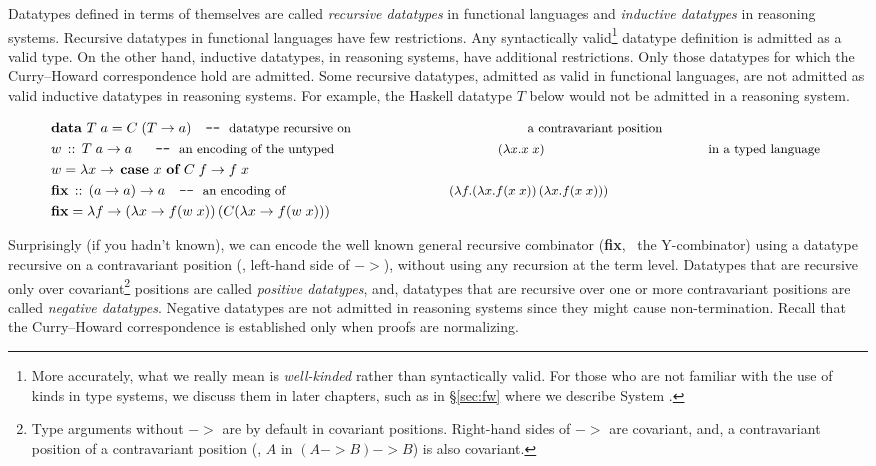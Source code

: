 Datatypes defined in terms of themselves are called \emph{recursive datatypes}
in functional languages and \emph{inductive datatypes} in reasoning systems.
Recursive datatypes in functional languages have few restrictions.
Any syntactically valid\footnote{
        More accurately, what we really mean is \emph{well-kinded} rather than
        syntactically valid. 
        For those who are not familiar with the use of kinds in type systems, 
        we discuss them in later chapters, such as
        in \S\ref{sec:fw} where we describe System \Fw.}
datatype definition is admitted as a valid type. On the other hand,
inductive datatypes, in reasoning systems, have additional restrictions.
Only those datatypes for which the Curry--Howard correspondence hold are
admitted. Some recursive datatypes, admitted as valid in functional languages,
are not admitted as valid inductive datatypes in reasoning systems. For example,
the Haskell datatype $T$ below would not be admitted in a reasoning system.
\vspace*{-2.5em}
\begin{singlespace}
\begin{align*}
& \textbf{data}~T\;a = C\;(T -> a) \quad
          \texttt{-}\texttt{-}~\text{\small datatype recursive on
                                        a contravariant position} \\
& w \,::\, T\;a -> a ~~ \quad
          \texttt{-}\texttt{-}~\text{\small an encoding of the untyped
                                     $(\lambda x.x\;x)$
                                     in a typed language}~ \\
& w = \lambda x -> \,\textbf{case}~x~\textbf{of}~C\;f -> f\;x \\
& \textbf{fix} \,::\, (a -> a) -> a \quad
          \texttt{-}\texttt{-}~\text{\small an encoding of 
                                     $(\lambda f.(\lambda x.f(x\;x))\,
                                                 (\lambda x.f(x\;x)))$} \\
& \textbf{fix} = \lambda f -> (\lambda x -> f (w\;x))\,(C(\lambda x -> f (w\;x)))
\end{align*}
\end{singlespace}\noindent
Surprisingly (if you hadn't known), we can encode the well known
general recursive combinator (\textbf{fix}, \aka\ the \textsf{Y}-combinator)
using a datatype recursive on a contravariant position (\ie, left-hand side of
$->$), without using any recursion at the term level.
Datatypes that are recursive only over covariant\footnote{Type arguments
        without $->$ are by default in covariant positions. Right-hand sides
        of $->$ are covariant, and, a contravariant position of
        a contravariant position (\eg, $A$ in $(A -> B) -> B$) is
        also covariant.}
positions are called \emph{positive datatypes}, and, datatypes
that are recursive over one or more contravariant positions are
called \emph{negative datatypes}. Negative datatypes are not admitted
in reasoning systems since they might cause non-termination. Recall that
the Curry--Howard correspondence is established only when proofs are normalizing.

